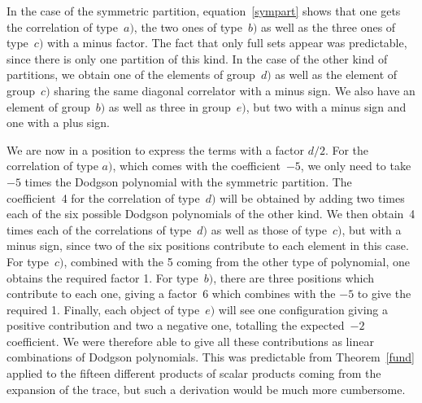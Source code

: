 \documentclass[pdftex]{sigma}
\numberwithin{equation}{section}
\begin{document}
In the case of the symmetric partition, equation~\eqref{sympart} shows that one gets the correlation of
type~$a)$, the two ones of type~$b)$ as well as the three ones of type~$c)$ with a minus factor. The
fact that only full sets appear was predictable, since there is only one partition of this kind. In the case of
the other kind of partitions, we obtain one of the elements of group~$d)$ as well as the element of
group~$c)$ sharing the same diagonal correlator with a minus sign. We also have an element of group~$b)$
as well as three in group~$e)$, but two with a minus sign and one with a plus sign.

We are now in a position to express the terms with a factor $d/2$. For the correlation of type $a)$, which
comes with the coefficient~$-5$, we only need to take $-5$ times the Dodgson polynomial with the symmetric
partition. The coefficient~4 for the correlation of type~$d)$ will be obtained by adding two times each of the
six possible Dodgson polynomials of the other kind. We then obtain~4 times each of the correlations of
type~$d)$ as well as those of type~$c)$, but with a minus sign, since two of the six positions contribute to
each element in this case. For type~$c)$, combined with the 5 coming from the other type of polynomial,
one obtains the required factor 1. For type~$b)$, there are three positions which contribute to each one,
giving a factor~6 which combines with the $-5$ to give the required 1. Finally, each object of type~$e)$
will see one configuration giving a positive contribution and two a negative one, totalling the expected~$-2$
coefficient. We were therefore able to give all these contributions as linear combinations of Dodgson
polynomials. This was predictable from Theorem~\ref{fund} applied to the fifteen different products of scalar
products coming from the expansion of the trace, but such a derivation would be much more
cumbersome.
\end{document}

